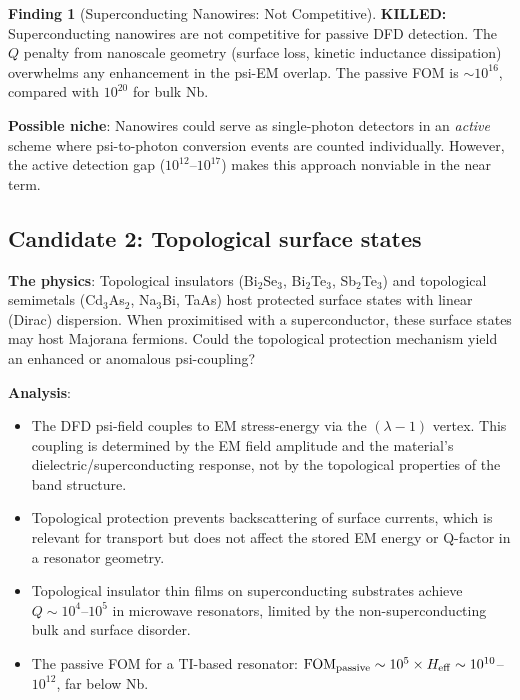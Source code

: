 \documentclass[11pt]{article}
\theoremstyle{definition}
\newtheorem{finding}[theorem]{Finding}
\theoremstyle{remark}
\newcommand{\FOMpassive}{\mathrm{FOM}_{\rm passive}}
\newcommand{\Heff}{H_{\rm eff}}
\newcommand{\killed}[1]{\textcolor{red!70!black}{\textbf{KILLED:} #1}}
\begin{document}
\begin{finding}[Superconducting Nanowires: Not Competitive]
\label{find:nanowires}
\killed{Superconducting nanowires are not competitive for passive
DFD detection.} The $Q$ penalty from nanoscale geometry (surface loss,
kinetic inductance dissipation) overwhelms any enhancement in the
psi-EM overlap. The passive FOM is $\sim 10^{16}$, compared with
$10^{20}$ for bulk Nb.

\textbf{Possible niche}: Nanowires could serve as single-photon
detectors in an \emph{active} scheme where psi-to-photon conversion
events are counted individually. However, the active detection gap
($10^{12}$--$10^{17}$) makes this approach nonviable in the near term.
\end{finding}

\subsection{Candidate 2: Topological surface states}
\label{sec:topological}

\textbf{The physics}: Topological insulators (Bi$_2$Se$_3$,
Bi$_2$Te$_3$, Sb$_2$Te$_3$) and topological semimetals (Cd$_3$As$_2$,
Na$_3$Bi, TaAs) host protected surface states with linear (Dirac)
dispersion. When proximitised with a superconductor, these surface
states may host Majorana fermions. Could the topological protection
mechanism yield an enhanced or anomalous psi-coupling?

\textbf{Analysis}:
\begin{itemize}[nosep]
  \item The DFD psi-field couples to EM stress-energy via the
    $(\lambda-1)$ vertex. This coupling is determined by the EM field
    amplitude and the material's dielectric/superconducting response,
    not by the topological properties of the band structure.
  \item Topological protection prevents backscattering of surface
    currents, which is relevant for transport but does not affect the
    stored EM energy or Q-factor in a resonator geometry.
  \item Topological insulator thin films on superconducting substrates
    achieve $Q \sim 10^4$--$10^5$ in microwave resonators, limited by
    the non-superconducting bulk and surface disorder.
  \item The passive FOM for a TI-based resonator:
    $\FOMpassive \sim 10^5 \times \Heff \sim 10^{10}$--$10^{12}$,
    far below Nb.
\end{itemize}
\end{document}
